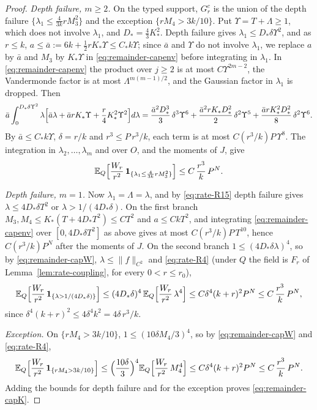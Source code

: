 \begin{proof}
\emph{Depth failure, $m\ge2$.} On the typed support, $G_r^c$ is the union of the depth failure $\{\lambda_1\le\frac4{3k}rM_3^2\}$ and the exception $\{rM_4>3k/10\}$. Put $\Upsilon=T+\Lambda\ge1$, which does not involve $\lambda_1$, and $D_*=\frac43K_*^2$. Depth failure gives $\lambda_1\le D_*\delta\Upsilon^2$, and as $r\le k$, $a\le\bar a:=6k+\frac12rK_*\Upsilon\le C_*k\Upsilon$; since $\bar a$ and $\Upsilon$ do not involve $\lambda_1$, we replace $a$ by $\bar a$ and $M_3$ by $K_*\Upsilon$ in \eqref{eq:remainder-capenv} before integrating in $\lambda_1$. In \eqref{eq:remainder-capenv} the product over $j\ge2$ is at most $C\Upsilon^{2m-2}$, the Vandermonde factor is at most $\Lambda^{m(m-1)/2}$, and the Gaussian factor in $\lambda_1$ is dropped. Then
\[
\bar a\int_0^{D_*\delta\Upsilon^2}\lambda\Bigl[\bar a\lambda+\bar arK_*\Upsilon+\frac r4K_*^2\Upsilon^2\Bigr]d\lambda=\frac{\bar a^2D_*^3}3\,\delta^3\Upsilon^6+\frac{\bar a^2rK_*D_*^2}2\,\delta^2\Upsilon^5+\frac{\bar arK_*^2D_*^2}8\,\delta^2\Upsilon^6 .
\]
By $\bar a\le C_*k\Upsilon$, $\delta=r/k$ and $r^3\le P\,r^3/k$, each term is at most $C(r^3/k)P\,\Upsilon^8$. The integration in $\lambda_2,\dots,\lambda_m$ and over $O$, and the moments of $J$, give
\[
\mathbb E_Q\Bigl[\frac{W_r}{r^2}\,\mathbf 1_{\{\lambda_1\le\frac4{3k}rM_3^2\}}\Bigr]\le C\,\frac{r^3}k\,P^N .
\]

\emph{Depth failure, $m=1$.} Now $\lambda_1=\Lambda=\lambda$, and by \eqref{eq:rate-R15} depth failure gives $\lambda\le4D_*\delta T^2$ or $\lambda>1/(4D_*\delta)$. On the first branch $M_3,M_4\le K_*(T+4D_*T^2)\le CT^2$ and $a\le CkT^2$, and integrating \eqref{eq:remainder-capenv} over $[0,4D_*\delta T^2]$ as above gives at most $C(r^3/k)P\,T^{10}$, hence $C(r^3/k)P^N$ after the moments of $J$. On the second branch $1\le(4D_*\delta\lambda)^4$, so by \eqref{eq:remainder-capW}, $\lambda\le\|f\|_{C^2}$ and \eqref{eq:rate-R4} (under $Q$ the field is $F_r$ of Lemma~\ref{lem:rate-coupling}, for every $0<r\le r_0$),
\[
\mathbb E_Q\Bigl[\frac{W_r}{r^2}\,\mathbf 1_{\{\lambda>1/(4D_*\delta)\}}\Bigr]\le(4D_*\delta)^4\,\mathbb E_Q\Bigl[\frac{W_r}{r^2}\,\lambda^4\Bigr]\le C\delta^4(k+r)^2P^N\le C\,\frac{r^3}k\,P^N,
\]
since $\delta^4(k+r)^2\le4\delta^4k^2=4\delta\,r^3/k$.

\emph{Exception.} On $\{rM_4>3k/10\}$, $1\le(10\delta M_4/3)^4$, so by \eqref{eq:remainder-capW} and \eqref{eq:rate-R4},
\[
\mathbb E_Q\Bigl[\frac{W_r}{r^2}\,\mathbf 1_{\{rM_4>3k/10\}}\Bigr]\le\Bigl(\frac{10\delta}3\Bigr)^4\mathbb E_Q\Bigl[\frac{W_r}{r^2}\,M_4^4\Bigr]\le C\delta^4(k+r)^2P^N\le C\,\frac{r^3}k\,P^N .
\]
Adding the bounds for depth failure and for the exception proves \eqref{eq:remainder-capK}.
\end{proof}

